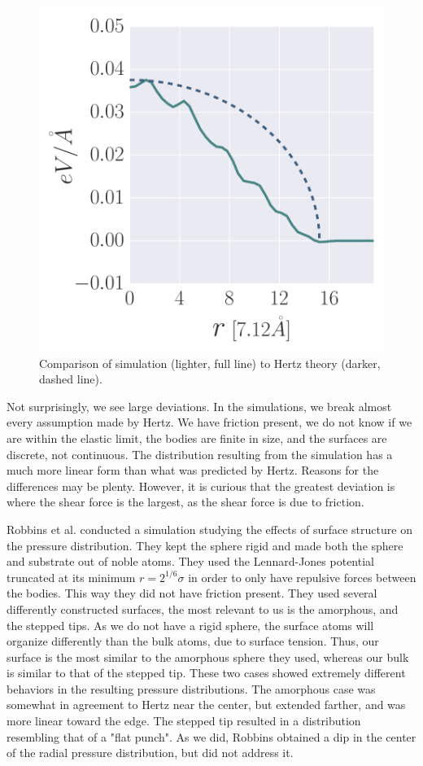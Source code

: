 \documentclass[twoside,english]{uiofysmaster}
\begin{document}
\begin{figure}
\centering
\includegraphics[width=0.5\linewidth]{figures/forceDistribution/HertzCompare}
\caption{Comparison of simulation (lighter, full line) to Hertz theory (darker, dashed line).}
\label{fig:HertzCompare}
\end{figure}


Not surprisingly, we see large deviations. 
In the simulations, we break almost every assumption made by Hertz.
We have friction present, we do not know if we are within the elastic limit, the bodies are finite in size, and the surfaces are discrete, not continuous. 
The distribution resulting from the simulation has a much more linear form than what was predicted by Hertz. 
Reasons for the differences may be plenty. 
However, it is curious that the greatest deviation is where the shear force is the largest, as the shear force is due to friction.
  
Robbins et al. conducted a simulation \cite{RobbinsSingleAsperity} studying the effects of surface structure on the pressure distribution.
They kept the sphere rigid and made both the sphere and substrate out of noble atoms.  
They used the Lennard-Jones potential truncated at its minimum $r=2^{1/6}\sigma$ in order to only have repulsive forces between the bodies. 
This way they did not have friction present.
They used several differently constructed surfaces, the most relevant to us is the amorphous, and the stepped tips. 
As we do not have a rigid sphere, the surface atoms will organize differently than the bulk atoms, due to surface tension.
Thus, our surface is the most similar to the amorphous sphere they used, 
whereas our bulk is similar to that of the stepped tip. 
These two cases showed extremely different behaviors in the resulting pressure distributions. 
The amorphous case was somewhat in agreement to Hertz near the center, but extended farther, and was more linear toward the edge. 
The stepped tip resulted in a distribution resembling that of a "flat punch".
As we did, Robbins obtained a dip in the center of the radial pressure distribution, but did not address it. 
  
\end{document}
